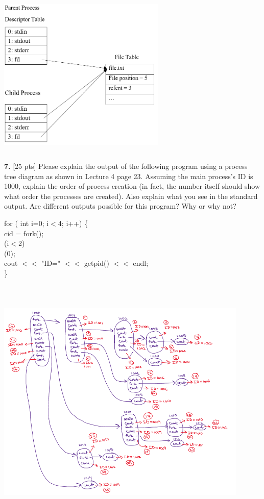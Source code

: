 \documentclass[12pt]{article}
\newcommand\tab[1][1cm]{\hspace*{#1}}
\begin{document}
\begin{center}
\includegraphics[width=8cm, height=8cm]{P6Line10}
\end{center}

{\bf 7.} [25 pts] Please explain the output of the following program using a process tree diagram as shown in Lecture 4 page 23. Assuming the main process's ID is 1000, explain the order of process creation (in fact, the number itself should show what order the processes are created). Also explain what you see in the standard output. Are different outputs possible for this program? Why or why not? 

\noindent
{\color{violet} for} ({\color{blue} int} i={\color{Green}0}; i$<${\color{Green}4}; i++) \{\\
\tab{\color{blue}int} cid = {\color{RawSienna}fork}();\\
\tab{\color{violet}if}(i$<${\color{Green}2})\\
\tab\tab{\color{RawSienna}wait}({\color{Green}0});\\
\tab cout $<<$ {\color{Maroon}"ID="} $<<$ {\color{RawSienna}getpid}() $<<$ endl;\\
\}

\begin{center}
\includegraphics[width=12cm, height=12cm]{P7}
\end{center}
\end{document}
